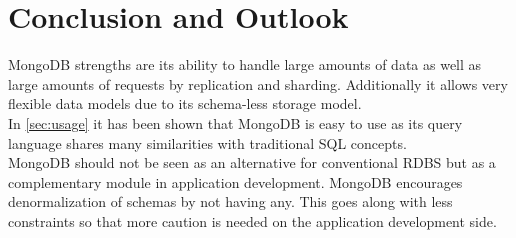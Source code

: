 \newpage
\section{Conclusion and Outlook}
\label{sec:conclusion}

MongoDB strengths are its ability to handle large amounts of data as well as
large amounts of requests by replication and sharding. Additionally it allows
very flexible data models due to its schema-less storage model.\\
In \autoref{sec:usage} it has been shown that MongoDB is easy to use as its
query language shares many similarities with traditional SQL concepts.\\
MongoDB should not be seen as an alternative for conventional RDBS but as a
complementary module in application development. MongoDB encourages
denormalization of schemas by not having any. This goes along with less
constraints so that more caution is needed on the application development side.





\newpage \begin{appendices} 
\appendixtocon %

\appendixpage %

\subsection*{\listappendixname}
\listofappendices

\newpage

\begin{subappendices}
\renewcommand{\setthesubsection}{\arabic{subsection}:}%

\label{apx:placeholder}

\end{subappendices}
\end{appendices}
